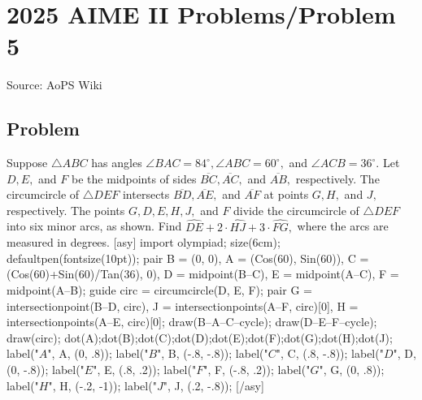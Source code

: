 \documentclass[12pt]{article}
\begin{document}
\section*{{2025 AIME II Problems/Problem 5}}
Source: AoPS Wiki

\subsection*{Problem}
Suppose $\triangle ABC$ has angles $\angle BAC = 84^\circ, \angle ABC=60^\circ,$ and $\angle ACB = 36^\circ.$ Let $D, E,$ and $F$ be the midpoints of sides $\overline{BC}, \overline{AC},$ and $\overline{AB},$ respectively. The circumcircle of $\triangle DEF$ intersects $\overline{BD}, \overline{AE},$ and $\overline{AF}$ at points $G, H,$ and $J,$ respectively. The points $G, D, E, H, J,$ and $F$ divide the circumcircle of $\triangle DEF$ into six minor arcs, as shown. Find $\widehat{DE}+2\cdot \widehat{HJ} + 3\cdot\widehat{FG},$ where the arcs are measured in degrees. [asy] import olympiad; size(6cm); defaultpen(fontsize(10pt)); pair B = (0, 0), A = (Cos(60), Sin(60)), C = (Cos(60)+Sin(60)/Tan(36), 0), D = midpoint(B--C), E = midpoint(A--C), F = midpoint(A--B); guide circ = circumcircle(D, E, F); pair G = intersectionpoint(B--D, circ), J = intersectionpoints(A--F, circ)[0], H = intersectionpoints(A--E, circ)[0]; draw(B--A--C--cycle); draw(D--E--F--cycle); draw(circ); dot(A);dot(B);dot(C);dot(D);dot(E);dot(F);dot(G);dot(H);dot(J); label("$A$", A, (0, .8)); label("$B$", B, (-.8, -.8)); label("$C$", C, (.8, -.8)); label("$D$", D, (0, -.8)); label("$E$", E, (.8, .2)); label("$F$", F, (-.8, .2)); label("$G$", G, (0, .8)); label("$H$", H, (-.2, -1)); label("$J$", J, (.2, -.8)); [/asy]
\end{document}

